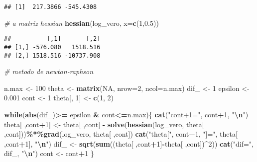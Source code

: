 \documentclass[
]{article}
\newenvironment{Shaded}{\begin{snugshade}}{\end{snugshade}}
\newcommand{\AttributeTok}[1]{\textcolor[rgb]{0.13,0.29,0.53}{#1}}
\newcommand{\CommentTok}[1]{\textcolor[rgb]{0.56,0.35,0.01}{\textit{#1}}}
\newcommand{\ConstantTok}[1]{\textcolor[rgb]{0.56,0.35,0.01}{#1}}
\newcommand{\ControlFlowTok}[1]{\textcolor[rgb]{0.13,0.29,0.53}{\textbf{#1}}}
\newcommand{\DecValTok}[1]{\textcolor[rgb]{0.00,0.00,0.81}{#1}}
\newcommand{\FloatTok}[1]{\textcolor[rgb]{0.00,0.00,0.81}{#1}}
\newcommand{\FunctionTok}[1]{\textcolor[rgb]{0.13,0.29,0.53}{\textbf{#1}}}
\newcommand{\NormalTok}[1]{#1}
\newcommand{\OtherTok}[1]{\textcolor[rgb]{0.56,0.35,0.01}{#1}}
\newcommand{\SpecialCharTok}[1]{\textcolor[rgb]{0.81,0.36,0.00}{\textbf{#1}}}
\newcommand{\StringTok}[1]{\textcolor[rgb]{0.31,0.60,0.02}{#1}}
\begin{document}
\begin{verbatim}
## [1]  217.3866 -545.4308
\end{verbatim}

\begin{Shaded}
\begin{Highlighting}[]
\CommentTok{\# a matriz hessian}
\FunctionTok{hessian}\NormalTok{(log\_vero, }\AttributeTok{x=}\FunctionTok{c}\NormalTok{(}\DecValTok{1}\NormalTok{,}\FloatTok{0.5}\NormalTok{))}
\end{Highlighting}
\end{Shaded}

\begin{verbatim}
##          [,1]       [,2]
## [1,] -576.080   1518.516
## [2,] 1518.516 -10737.908
\end{verbatim}

\begin{Shaded}
\begin{Highlighting}[]
\CommentTok{\# metodo de newton{-}raphson}

\NormalTok{n.max }\OtherTok{\textless{}{-}} \DecValTok{100}
\NormalTok{theta }\OtherTok{\textless{}{-}} \FunctionTok{matrix}\NormalTok{(}\ConstantTok{NA}\NormalTok{, }\AttributeTok{nrow=}\DecValTok{2}\NormalTok{, }\AttributeTok{ncol=}\NormalTok{n.max)}
\NormalTok{dif\_ }\OtherTok{\textless{}{-}} \DecValTok{1}
\NormalTok{epsilon }\OtherTok{\textless{}{-}} \FloatTok{0.001}
\NormalTok{cont }\OtherTok{\textless{}{-}} \DecValTok{1}
\NormalTok{theta[, }\DecValTok{1}\NormalTok{] }\OtherTok{\textless{}{-}} \FunctionTok{c}\NormalTok{(}\DecValTok{1}\NormalTok{, }\DecValTok{2}\NormalTok{)}

\ControlFlowTok{while}\NormalTok{(}\FunctionTok{abs}\NormalTok{(dif\_)}\SpecialCharTok{\textgreater{}=}\NormalTok{ epsilon }\SpecialCharTok{\&}\NormalTok{ cont}\SpecialCharTok{\textless{}=}\NormalTok{n.max)\{}
  \FunctionTok{cat}\NormalTok{(}\StringTok{"cont+1="}\NormalTok{, cont}\SpecialCharTok{+}\DecValTok{1}\NormalTok{, }\StringTok{"}\SpecialCharTok{\textbackslash{}n}\StringTok{"}\NormalTok{)}
\NormalTok{  theta[ ,cont}\SpecialCharTok{+}\DecValTok{1}\NormalTok{] }\OtherTok{\textless{}{-}}\NormalTok{ theta[ ,cont] }\SpecialCharTok{{-}} \FunctionTok{solve}\NormalTok{(}\FunctionTok{hessian}\NormalTok{(log\_vero, theta[ ,cont]))}\SpecialCharTok{\%*\%}\FunctionTok{grad}\NormalTok{(log\_vero, theta[ ,cont])}
  \FunctionTok{cat}\NormalTok{(}\StringTok{"theta["}\NormalTok{, cont}\SpecialCharTok{+}\DecValTok{1}\NormalTok{, }\StringTok{"]="}\NormalTok{, theta[ ,cont}\SpecialCharTok{+}\DecValTok{1}\NormalTok{], }\StringTok{"}\SpecialCharTok{\textbackslash{}n}\StringTok{"}\NormalTok{)}
\NormalTok{  dif\_ }\OtherTok{\textless{}{-}} \FunctionTok{sqrt}\NormalTok{(}\FunctionTok{sum}\NormalTok{((theta[ ,cont}\SpecialCharTok{+}\DecValTok{1}\NormalTok{]}\SpecialCharTok{{-}}\NormalTok{theta[ ,cont])}\SpecialCharTok{\^{}}\DecValTok{2}\NormalTok{))}
  \FunctionTok{cat}\NormalTok{(}\StringTok{"dif="}\NormalTok{, dif\_, }\StringTok{"}\SpecialCharTok{\textbackslash{}n}\StringTok{"}\NormalTok{)}
\NormalTok{  cont }\OtherTok{\textless{}{-}}\NormalTok{ cont}\SpecialCharTok{+}\DecValTok{1}
\NormalTok{\}}
\end{Highlighting}
\end{Shaded}
\end{document}
